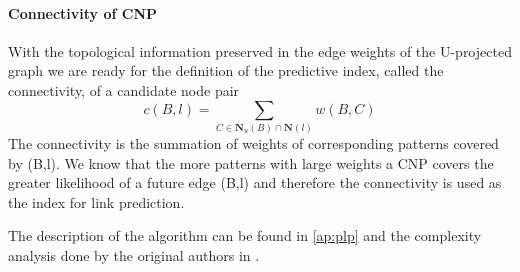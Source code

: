 \paragraph{Connectivity of CNP}
With the topological information preserved in the edge weights of the U-projected graph we are ready for the definition of the predictive index, called the connectivity, of a candidate node pair
$$
 c(B,l) = \sum_{C\in\textbf{N}_u(B) \cap \textbf{N}(l) } w(B,C)
$$
The connectivity is the summation of weights of corresponding patterns covered by (B,l). We know that the more patterns with large weights a CNP covers the greater likelihood of a future edge (B,l) and therefore the connectivity is used as the index for link prediction.

The description of the algorithm can be found in \ref{ap:plp} and the complexity analysis done by the original authors in \cite{plp}.
